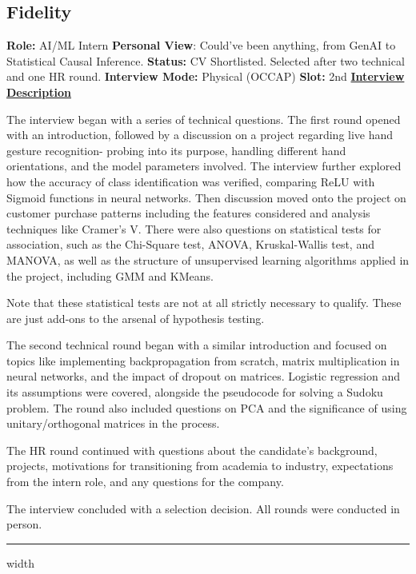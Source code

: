 \documentclass[12pt]{article}
\begin{document}
\subsection{Fidelity}

\textbf{Role:} AI/ML Intern
\newline
\textbf{Personal View}: Could've been anything, from GenAI to Statistical Causal Inference.
\newline
\textbf{Status:} CV Shortlisted. Selected after two technical and one HR round.
\newline
\textbf{Interview Mode:} Physical (OCCAP)
\newline
\textbf{Slot:} 2nd
\newline
\vspace{10pt}
\newline
\underline{\textbf{Interview Description}}
\newline

The interview began with a series of technical questions. The first round opened with an introduction, followed by a discussion on a project regarding live hand gesture recognition-  probing into its purpose, handling different hand orientations, and the model parameters involved. The interview further explored how the accuracy of class identification was verified, comparing ReLU with Sigmoid functions in neural networks. 
Then discussion moved onto the project on customer purchase patterns including the features considered and analysis techniques like Cramer's V. There were also questions on statistical tests for association, such as the Chi-Square test, ANOVA, Kruskal-Wallis test, and MANOVA, as well as the structure of unsupervised learning algorithms applied in the project, including GMM and KMeans.

Note that these statistical tests are not at all strictly necessary to qualify. These are just add-ons to the arsenal of hypothesis testing.

The second technical round began with a similar introduction and focused on topics like implementing backpropagation from scratch, matrix multiplication in neural networks, and the impact of dropout on matrices. Logistic regression and its assumptions were covered, alongside the pseudocode for solving a Sudoku problem. The round also included questions on PCA and the significance of using unitary/orthogonal matrices in the process.

The HR round continued with questions about the candidate's background, projects, motivations for transitioning from academia to industry, expectations from the intern role, and any questions for the company. 

The interview concluded with a selection decision. All rounds were conducted in person.

\vspace{10cm}


\hrule height 2pt width \linewidth
\begin{center}
\end{center}
\end{document}
